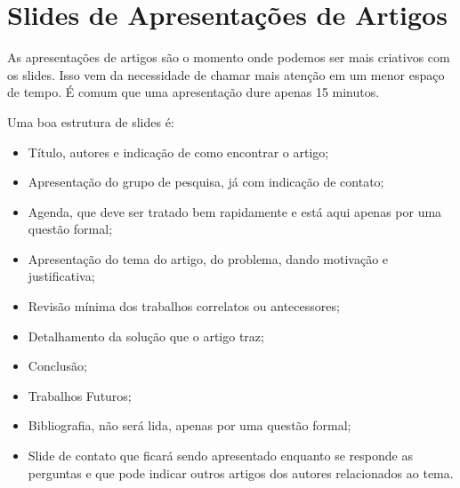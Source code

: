 \section{Slides de Apresentações de Artigos}

As apresentações de artigos são o momento onde podemos ser mais criativos com os slides. Isso vem da necessidade de chamar mais atenção em um menor espaço de tempo. É comum que uma apresentação dure apenas 15 minutos.


Uma boa estrutura de slides é:
\begin{itemize}
    \item Título, autores e indicação de como encontrar o artigo;
    \item Apresentação do grupo de pesquisa, já com indicação de contato;
    \item Agenda, que deve ser tratado bem rapidamente e está aqui apenas por uma questão formal;
    \item Apresentação do tema do artigo, do problema, dando motivação e justificativa;
    \item Revisão mínima dos trabalhos correlatos ou antecessores;
    \item Detalhamento da solução que o artigo traz;
    \item Conclusão;
    \item Trabalhos Futuros;
    \item Bibliografia, não será lida, apenas por uma questão formal;
    \item Slide de contato que ficará sendo apresentado enquanto se responde as perguntas e que pode indicar outros artigos dos autores relacionados ao tema.
\end{itemize}

